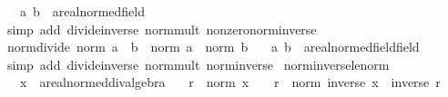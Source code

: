 \begin{isabellebody}
\ \ \ a\ b\ {\isacharcolon}{\kern0pt}{\isacharcolon}{\kern0pt}\ {\isachardoublequoteopen}{\isacharprime}{\kern0pt}a{\isacharcolon}{\kern0pt}{\isacharcolon}{\kern0pt}real{\isacharunderscore}{\kern0pt}normed{\isacharunderscore}{\kern0pt}field{\isachardoublequoteclose}\isanewline
%
\isadelimproof
\ \ %
\endisadelimproof
%
\isatagproof
{}\isamarkupfalse%
\ {\isacharparenleft}{\kern0pt}simp\ add{\isacharcolon}{\kern0pt}\ divide{\isacharunderscore}{\kern0pt}inverse\ norm{\isacharunderscore}{\kern0pt}mult\ nonzero{\isacharunderscore}{\kern0pt}norm{\isacharunderscore}{\kern0pt}inverse{\isacharparenright}{\kern0pt}%
\endisatagproof
{\isafoldproof}%
%
\isadelimproof
\isanewline
%
\endisadelimproof
\isanewline
{}\isamarkupfalse%
\ norm{\isacharunderscore}{\kern0pt}divide{\isacharcolon}{\kern0pt}\ {\isachardoublequoteopen}norm\ {\isacharparenleft}{\kern0pt}a\ {\isacharslash}{\kern0pt}\ b{\isacharparenright}{\kern0pt}\ {\isacharequal}{\kern0pt}\ norm\ a\ {\isacharslash}{\kern0pt}\ norm\ b{\isachardoublequoteclose}\isanewline
\ \ \ a\ b\ {\isacharcolon}{\kern0pt}{\isacharcolon}{\kern0pt}\ {\isachardoublequoteopen}{\isacharprime}{\kern0pt}a{\isacharcolon}{\kern0pt}{\isacharcolon}{\kern0pt}{\isacharbraceleft}{\kern0pt}real{\isacharunderscore}{\kern0pt}normed{\isacharunderscore}{\kern0pt}field{\isacharcomma}{\kern0pt}field{\isacharbraceright}{\kern0pt}{\isachardoublequoteclose}\isanewline
%
\isadelimproof
\ \ %
\endisadelimproof
%
\isatagproof
{}\isamarkupfalse%
\ {\isacharparenleft}{\kern0pt}simp\ add{\isacharcolon}{\kern0pt}\ divide{\isacharunderscore}{\kern0pt}inverse\ norm{\isacharunderscore}{\kern0pt}mult\ norm{\isacharunderscore}{\kern0pt}inverse{\isacharparenright}{\kern0pt}%
\endisatagproof
{\isafoldproof}%
%
\isadelimproof
\isanewline
%
\endisadelimproof
\isanewline
{}\isamarkupfalse%
\ norm{\isacharunderscore}{\kern0pt}inverse{\isacharunderscore}{\kern0pt}le{\isacharunderscore}{\kern0pt}norm{\isacharcolon}{\kern0pt}\isanewline
\ \ \ x\ {\isacharcolon}{\kern0pt}{\isacharcolon}{\kern0pt}\ {\isachardoublequoteopen}{\isacharprime}{\kern0pt}a{\isacharcolon}{\kern0pt}{\isacharcolon}{\kern0pt}real{\isacharunderscore}{\kern0pt}normed{\isacharunderscore}{\kern0pt}div{\isacharunderscore}{\kern0pt}algebra{\isachardoublequoteclose}\isanewline
\ \ \ {\isachardoublequoteopen}r\ {\isasymle}\ norm\ x\ {\isasymLongrightarrow}\ {}\ {\isacharless}{\kern0pt}\ r\ {\isasymLongrightarrow}\ norm\ {\isacharparenleft}{\kern0pt}inverse\ x{\isacharparenright}{\kern0pt}\ {\isasymle}\ inverse\ r{\isachardoublequoteclose}\isanewline

\end{isabellebody}
